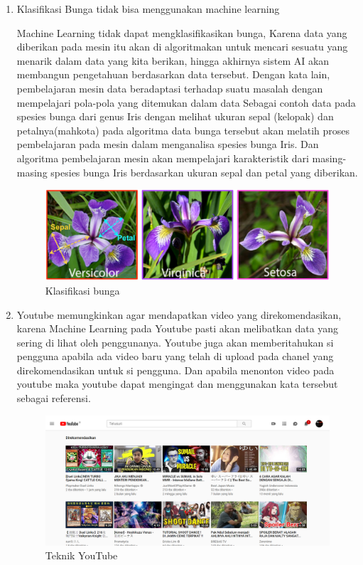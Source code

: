\begin{enumerate}
\item Klasifikasi Bunga tidak bisa menggunakan machine learning
	\par Machine Learning tidak dapat mengklasifikasikan bunga, Karena data yang diberikan pada 
mesin itu akan di algoritmakan untuk mencari sesuatu yang menarik dalam data yang kita 
berikan, hingga akhirnya sistem AI akan membangun pengetahuan berdasarkan data tersebut.
Dengan kata lain, pembelajaran mesin data beradaptasi terhadap suatu masalah dengan mempelajari pola-pola yang ditemukan dalam data
Sebagai contoh data pada spesies bunga dari genus Iris dengan melihat ukuran sepal (kelopak) dan petalnya(mahkota) pada algoritma data bunga tersebut akan melatih proses pembelajaran pada mesin dalam menganalisa spesies bunga Iris. Dan algoritma pembelajaran mesin akan mempelajari karakteristik dari masing-masing spesies bunga Iris berdasarkan ukuran sepal dan petal yang diberikan.
	\begin{figure}[ht]
		\centering
		\includegraphics[scale=0.5]{figures/andi/4-2.png}
		\caption{Klasifikasi bunga}
		\label{Contoh Ilustrasi}
	\end{figure}

\item Youtube memungkinkan agar mendapatkan video yang direkomendasikan, karena Machine Learning pada Youtube pasti akan melibatkan data yang sering di lihat oleh penggunanya.
Youtube juga akan memberitahukan si pengguna apabila ada video baru yang telah di upload pada chanel yang direkomendasikan untuk si pengguna. Dan apabila menonton video pada youtube maka youtube dapat mengingat dan menggunakan kata tersebut sebagai referensi.
	\begin{figure}[ht]
		\centering
		\includegraphics[scale=0.5]{figures/andi/4-3.PNG}
		\caption{Teknik YouTube}
		\label{Contoh Ilustrasi}
	\end{figure}


\end{enumerate}
